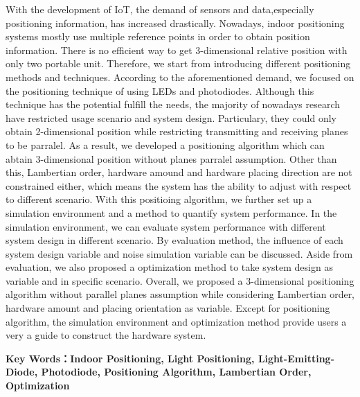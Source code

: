 \begin{abstractEN}

    With the development of IoT, the demand of sensors and data,especially positioning information, has increased drastically. Nowadays, indoor positioning systems mostly use multiple reference points in order to obtain position information. There is no efficient way to get 3-dimensional relative position with only two portable unit. Therefore, we start from introducing different positioning methods and techniques. According to the aforementioned demand, we focused on the positioning technique of using LEDs and photodiodes. Although this technique has the potential fulfill the needs, the majority of nowadays research have restricted usage scenario and system design. Particulary, they could only obtain 2-dimensional position while restricting transmitting and receiving planes to be parralel. As a result, we developed a positioning algorithm which can abtain 3-dimensional position without planes parralel assumption. Other than this, Lambertian order, hardware amound and hardware placing direction are not constrained either, which means the system has the ability to adjust with respect to different scenario. With this positioing algorithm, we further set up a simulation environment and a method to quantify system performance. In the simulation environment, we can evaluate system performance with different system design in different scenario. By evaluation method, the influence of each system design variable and noise simulation variable can be discussed. Aside from evaluation, we also proposed a optimization method to take system design as variable and in specific scenario. Overall, we proposed a 3-dimensional positioning algorithm without parallel planes assumption while considering Lambertian order, hardware amount and placing orientation as variable. Except for positioning algorithm, the simulation environment and optimization method provide users a very a guide to construct the hardware system. 

    \vspace{1cm}
    \noindent \textbf{Key Words：Indoor Positioning, Light Positioning, Light-Emitting-Diode, Photodiode, Positioning Algorithm, Lambertian Order, Optimization}

\end{abstractEN}
